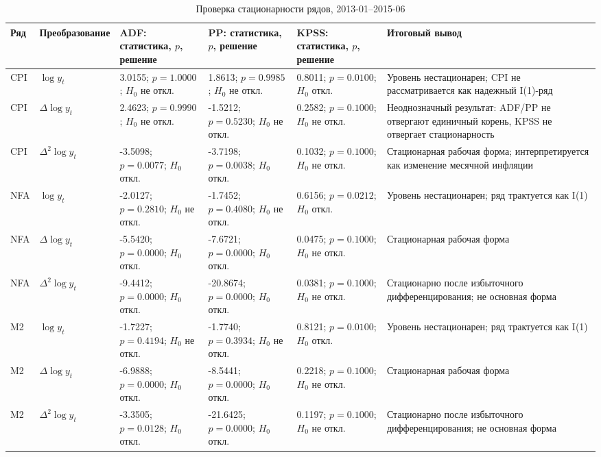 \documentclass[12pt,a4paper]{article}
\begin{document}
\begin{table}[H]
\centering
\caption{Проверка стационарности рядов, 2013-01--2015-06}
\scriptsize
\begin{adjustbox}{max width=\textwidth}
\begin{tabularx}{\textwidth}{llYYYY}
\toprule
Ряд & Преобразование & ADF: статистика, $p$, решение & PP: статистика, $p$, решение & KPSS: статистика, $p$, решение & Итоговый вывод \\
\midrule
CPI & $\log y_t$ & 3.0155; $p=1.0000$; $H_0$ не откл. & 1.8613; $p=0.9985$; $H_0$ не откл. & 0.8011; $p=0.0100$; $H_0$ откл. & Уровень нестационарен; CPI не рассматривается как надежный I(1)-ряд \\
CPI & $\Delta \log y_t$ & 2.4623; $p=0.9990$; $H_0$ не откл. & -1.5212; $p=0.5230$; $H_0$ не откл. & 0.2582; $p=0.1000$; $H_0$ не откл. & Неоднозначный результат: ADF/PP не отвергают единичный корень, KPSS не отвергает стационарность \\
CPI & $\Delta^2 \log y_t$ & -3.5098; $p=0.0077$; $H_0$ откл. & -3.7198; $p=0.0038$; $H_0$ откл. & 0.1032; $p=0.1000$; $H_0$ не откл. & Стационарная рабочая форма; интерпретируется как изменение месячной инфляции \\
NFA & $\log y_t$ & -2.0127; $p=0.2810$; $H_0$ не откл. & -1.7452; $p=0.4080$; $H_0$ не откл. & 0.6156; $p=0.0212$; $H_0$ откл. & Уровень нестационарен; ряд трактуется как I(1) \\
NFA & $\Delta \log y_t$ & -5.5420; $p=0.0000$; $H_0$ откл. & -7.6721; $p=0.0000$; $H_0$ откл. & 0.0475; $p=0.1000$; $H_0$ не откл. & Стационарная рабочая форма \\
NFA & $\Delta^2 \log y_t$ & -9.4412; $p=0.0000$; $H_0$ откл. & -20.8674; $p=0.0000$; $H_0$ откл. & 0.0381; $p=0.1000$; $H_0$ не откл. & Стационарно после избыточного дифференцирования; не основная форма \\
M2 & $\log y_t$ & -1.7227; $p=0.4194$; $H_0$ не откл. & -1.7740; $p=0.3934$; $H_0$ не откл. & 0.8121; $p=0.0100$; $H_0$ откл. & Уровень нестационарен; ряд трактуется как I(1) \\
M2 & $\Delta \log y_t$ & -6.9888; $p=0.0000$; $H_0$ откл. & -8.5441; $p=0.0000$; $H_0$ откл. & 0.2218; $p=0.1000$; $H_0$ не откл. & Стационарная рабочая форма \\
M2 & $\Delta^2 \log y_t$ & -3.3505; $p=0.0128$; $H_0$ откл. & -21.6425; $p=0.0000$; $H_0$ откл. & 0.1197; $p=0.1000$; $H_0$ не откл. & Стационарно после избыточного дифференцирования; не основная форма \\
\bottomrule
\end{tabularx}
\end{adjustbox}
\normalsize
\end{table}
\end{document}
